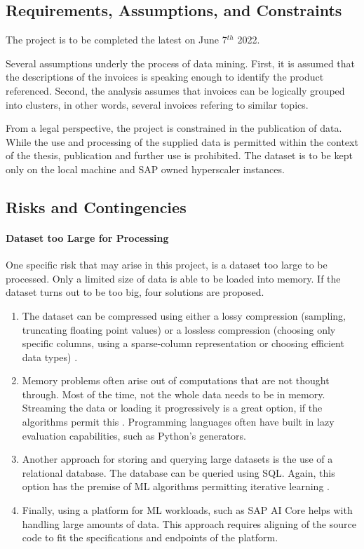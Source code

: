 \subsection{Requirements, Assumptions, and Constraints}
The project is to be completed the latest on June 7$^{th}$ 2022. 

Several assumptions underly the process of data mining. First, it is assumed that the descriptions of the invoices is speaking enough to identify the product referenced.
Second, the analysis assumes that invoices can be logically grouped into clusters, in other words, several invoices refering to similar topics.

From a legal perspective, the project is constrained in the publication of data. While the use and processing of the supplied data is permitted within the context of the thesis, publication and further use is prohibited. The dataset is to be kept only on the local machine and SAP owned hyperscaler instances.

\subsection{Risks and Contingencies}
\paragraph{Dataset too Large for Processing} One specific risk that may arise in this project, is a dataset too large to be processed. Only a limited size of data is able to be loaded into memory. If the dataset turns out to be too big, four solutions are proposed.

\begin{enumerate}
	\item The dataset can be compressed using either a lossy compression (sampling, truncating floating point values) or a lossless compression (choosing only specific columns, using a sparse-column representation or choosing efficient data types) \cite{largeDataSetMedium}.
	\item Memory problems often arise out of computations that are not thought through. Most of the time, not the whole data needs to be in memory. Streaming the data or loading it progressively is a great option, if the algorithms permit this \cite{largeDataSetBrownlee}. Programming languages often have built in lazy evaluation capabilities, such as Python's generators.
	\item Another approach for storing and querying large datasets is the use of a relational database. The database can be queried using \ac{SQL}. Again, this option has the premise of \ac{ML} algorithms permitting iterative learning \cite{largeDataSetBrownlee}. 
	\item Finally, using a platform for \ac{ML} workloads, such as SAP AI Core helps with handling large amounts of data. This approach requires aligning of the source code to fit the specifications and endpoints of the platform.
\end{enumerate}

